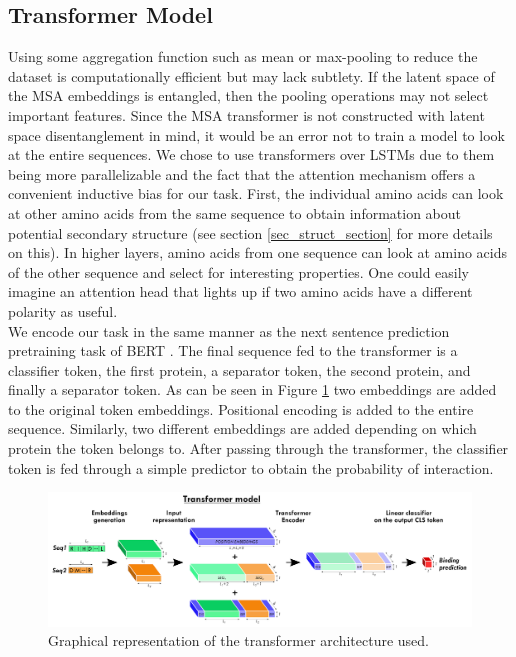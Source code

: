 \documentclass[11pt,a4paper]{article}
\begin{document}
\subsection{Transformer Model}

Using some aggregation function such as mean or max-pooling to reduce the dataset is computationally efficient but may lack subtlety. If the latent space of the MSA embeddings is entangled, then the pooling operations may not select important features. Since the MSA transformer is not constructed with latent space disentanglement in mind, it would be an error not to train a model to look at the entire sequences. We chose to use transformers \cite{NIPS2017_3f5ee243} over LSTMs \cite{hochreiter1997long} due to them being more parallelizable and the fact that the attention mechanism offers a convenient inductive bias for our task.
First, the individual amino acids can look at other amino acids from the same sequence to obtain information about %
potential secondary structure (see section \ref{sec_struct_section} for more details on this). In higher layers, amino acids from one sequence can look at amino acids of the other sequence and select for interesting properties. One could easily imagine an attention head that lights up if two amino acids have a different polarity as useful. \\
We encode our task in the same manner as the next sentence prediction pretraining task of BERT \cite{devlin-etal-2019-bert}. The final sequence fed to the transformer is a classifier token, the first protein, a separator token, the second protein, and finally a separator token. As can be seen in Figure \ref{fig:transformer_arch} two embeddings are added to the original token embeddings. Positional encoding is added to the entire sequence. Similarly, two different embeddings are added depending on which protein the token belongs to. After passing through the transformer, the classifier token is fed through a simple predictor to obtain the probability of interaction.

\begin{figure}[ht]
\centering
\includegraphics[width=\textwidth]{images/transformer architecture.png}
\caption{Graphical representation of the transformer architecture used.}
\label{fig:transformer_arch}
\end{figure}
\end{document}
